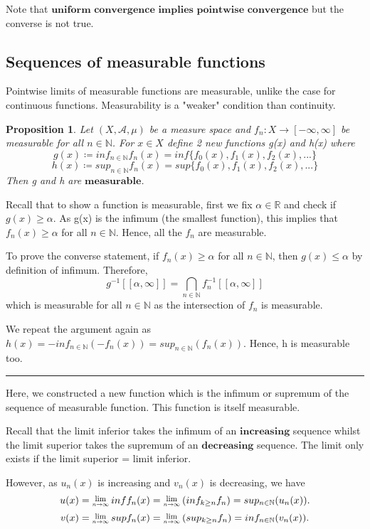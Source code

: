 \documentclass[twoside]{article}
\newcommand{\Lim}[1]{\raisebox{0.5ex}{\scalebox{0.8}{$\displaystyle \lim_{#1}\;$}}}
\newtheorem{proposition}[theorem]{Proposition}
\newenvironment{proof}{{\bf Proof:}}{\hfill\rule{2mm}{2mm}}
\begin{document}
Note that $\textbf{uniform convergence implies pointwise convergence}$ but the converse is not true.

\subsection{Sequences of measurable functions}
Pointwise limits of measurable functions are measurable, unlike the case for continuous functions. Measurability is a "weaker" condition than continuity.

\begin{proposition}
Let $(X, \mathcal{A}, \mu)$ be a measure space and $f_n: X \rightarrow [-\infty, \infty]$ be measurable for all $n \in \mathbb{N}$. For $x \in X$ define 2 new functions g(x) and h(x) where
$$
g(x) \coloneqq inf_{n \in \mathbb{N}}f_n(x) = inf\{f_0(x), f_1(x), f_2(x), ...\}
$$
$$
h(x) \coloneqq sup_{n \in \mathbb{N}}f_n(x) = sup\{f_0(x), f_1(x), f_2(x), ...\}
$$
Then g and h are $\textbf{measurable}$.
\end{proposition}

\begin{proof}
Recall that to show a function is measurable, first we fix $\alpha \in \mathbb{R}$ and check if $g(x) \geq \alpha$. As g(x) is the infimum (the smallest function), this implies that $f_n(x) \geq \alpha$ for all $n \in \mathbb{N}$. Hence, all the $f_n$ are measurable.

To prove the converse statement, if $f_n(x) \geq \alpha$ for all $n \in \mathbb{N}$, then $g(x) \leq \alpha$ by definition of infimum. Therefore, 
$$
g^{-1}[[\alpha, \infty]] = \bigcap_{n \in \mathbb{N}}f_n^{-1}[[\alpha, \infty]]
$$
which is measurable for all $n \in \mathbb{N}$ as the intersection of $f_n$ is measurable. 

We repeat the argument again as $h(x) = -inf_{n \in \mathbb{N}}(-f_n(x)) = sup_{n \in \mathbb{N}}(f_n(x))$. Hence, h is measurable too.
\end{proof}

Here, we constructed a new function which is the infimum or supremum of the sequence of measurable function. This function is itself measurable.

\bigskip

Recall that the limit inferior takes the infimum of an $\textbf{increasing}$ sequence whilst the limit superior takes the supremum of an $\textbf{decreasing}$ sequence. The limit only exists if the limit superior = limit inferior.

However, as $u_n(x)$ is increasing and $v_n(x)$ is decreasing, we have 
$$
u(x) = \Lim{n\rightarrow \infty}inf f_n(x) = \Lim{n \rightarrow \infty}(inf_{k \geq n}f_n) = sup_{n \in \mathbb{N}}(u_n(x)).
$$
$$
v(x) = \Lim{n\rightarrow \infty}sup f_n(x) = \Lim{n \rightarrow \infty}(sup_{k \geq n}f_n) = inf_{n \in \mathbb{N}}(v_n(x)).
$$
\end{document}
